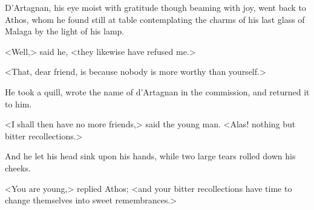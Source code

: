 D'Artagnan, his eye moist with gratitude though beaming with joy, went back to Athos, whom he found still at table contemplating the charms of his last glass of Malaga by the light of his lamp. 

<Well,> said he, <they likewise have refused me.> 

<That, dear friend, is because nobody is more worthy than yourself.> 

He took a quill, wrote the name of d'Artagnan in the commission, and returned it to him. 

<I shall then have no more friends,> said the young man. <Alas! nothing but bitter recollections.> 

And he let his head sink upon his hands, while two large tears rolled down his cheeks. 

<You are young,> replied Athos; <and your bitter recollections have time to change themselves into sweet remembrances.> 


